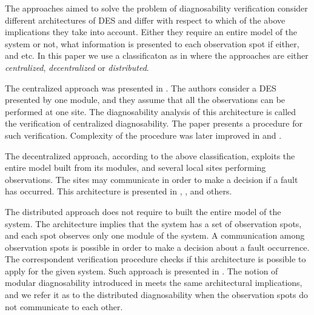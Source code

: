\documentclass[a4paper, 10pt, conference]{ieeeconf}
\begin{document}
The approaches aimed to solve the problem of diagnosability verification
consider different architectures of DES and differ with respect to which of the
above implications they take into account. Either they require an entire model
of the system or not, what information is presented to each observation spot if
either, and etc. In this paper we use a classificaton as in
\cite{su_global_2005} where the approaches are either \emph{centralized},
\emph{decentralized} or \emph{distributed}.

The centralized approach was presented in \cite{sampath_diagnosability_1995}.
The authors consider a DES presented by one module, and they assume that all the
observations can be performed at one site. The diagnosability analysis of this
architecture is called the verification of centralized diagnosability. The paper
presents a procedure for such verification. Complexity of the procedure was
later improved in \cite{jiang_polynomial_2001} and
\cite{yoo_polynomial-time_2002}.

The decentralized approach, according to the above classification, exploits the
entire model built from its modules, and several local sites performing
observations. The sites may communicate in order to make a decision if a fault
has occurred. This architecture is presented in \cite{debouk_coordinated_1998},
\cite{qiu_decentralized_2006}, \cite{wang_diagnosis_2007} and others.

The distributed approach does not require to built the entire model of the
system. The architecture implies that the system has a set of observation spots,
and each spot observes only one module of the system. A communication among
observation spots is possible in order to make a decision about a fault
occurrence. The correspondent verification procedure checks if this architecture
is possible to apply for the given system. Such approach is presented in
\cite{su_distributed_2002}. The notion of modular diagnosability introduced in
\cite{contant_diagnosability_2006} meets the same architectural implications,
and we refer it as to the distributed diagnosability when the observation spots
do not communicate to each other.

\end{document}
